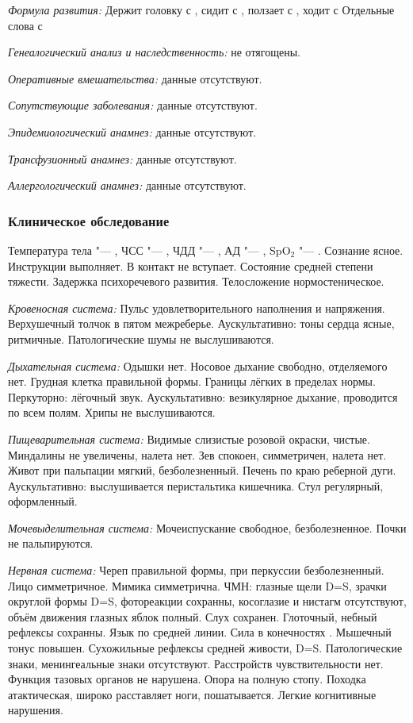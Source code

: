 \documentclass[a4paper,14pt]{extarticle}
\newcommand{\months}{мес.}
\newcommand{\oCelsius}{\tcdegree{}C}
\newcommand{\bpm}{уд/мин}
\newcommand{\mpm}{/мин}
\newcommand{\torr}{торр}
\begin{document}
\emph{Формула развития:}
Держит головку с \numprint[\months]{2}, сидит с \numprint[\months]{7}, ползает с \numprint[\months]{11}, ходит с \numprint[\months]{22}
Отдельные слова с \numprint[\months]{10--11}

\emph{Генеалогический анализ и наследственность:} не отягощены.

\emph{Оперативные вмешательства:} данные отсутствуют.

\emph{Сопутствующие заболевания:} данные отсутствуют.

\emph{Эпидемиологический анамнез:} данные отсутствуют.

\emph{Трансфузионный анамнез:} данные отсутствуют.

\emph{Аллергологический анамнез:} данные отсутствуют.

\subsubsection*{Клиническое обследование}

Температура тела "--- \numprint[\oCelsius]{36.6}, ЧСС "--- \numprint[\bpm]{122}, ЧДД "--- \numprint[\mpm]{29}, АД "--- \numprint[\torr]{80/55}, SpO$_2$ "--- .
Сознание ясное.
Инструкции выполняет.
В контакт не вступает.
Состояние средней степени тяжести.
Задержка психоречевого развития.
Телосложение нормостеническое.

\emph{Кровеносная система:} Пульс удовлетворительного наполнения и напряжения. Верхушечный толчок в пятом межреберье. Аускультативно: тоны сердца ясные, ритмичные. Патологические шумы не выслушиваются.

\emph{Дыхательная система:} Одышки нет. Носовое дыхание свободно, отделяемого нет. Грудная клетка правильной формы. Границы лёгких в пределах нормы. Перкуторно: лёгочный звук. Аускультативно: везикулярное дыхание, проводится по всем полям. Хрипы не выслушиваются.

\emph{Пищеварительная система:} Видимые слизистые розовой окраски, чистые. Миндалины не увеличены, налета нет. Зев спокоен, симметричен, налета нет. Живот при пальпации мягкий, безболезненный. Печень по краю реберной дуги. Аускультативно: выслушивается перистальтика кишечника. Стул регулярный, оформленный.

\emph{Мочевыделительная система:} Мочеиспускание свободное, безболезненное. Почки не пальпируются.

\emph{Нервная система:} Череп правильной формы, при перкуссии безболезненный. Лицо симметричное. Мимика симметрична. ЧМН: глазные щели D=S, зрачки округлой формы D=S, фотореакции сохранны, косоглазие и нистагм отсутствуют, объём движения глазных яблок полный. Слух сохранен. Глоточный, небный рефлексы сохранны. Язык по средней линии. Сила в конечностях . Мышечный тонус повышен. Сухожильные рефлексы средней живости, D=S. Патологические знаки, менингеальные знаки отсутствуют. Расстройств чувствительности нет. Функция тазовых органов не нарушена. Опора на полную стопу. Походка атактическая, широко расставляет ноги, пошатывается. Легкие когнитивные нарушения.
\end{document}
